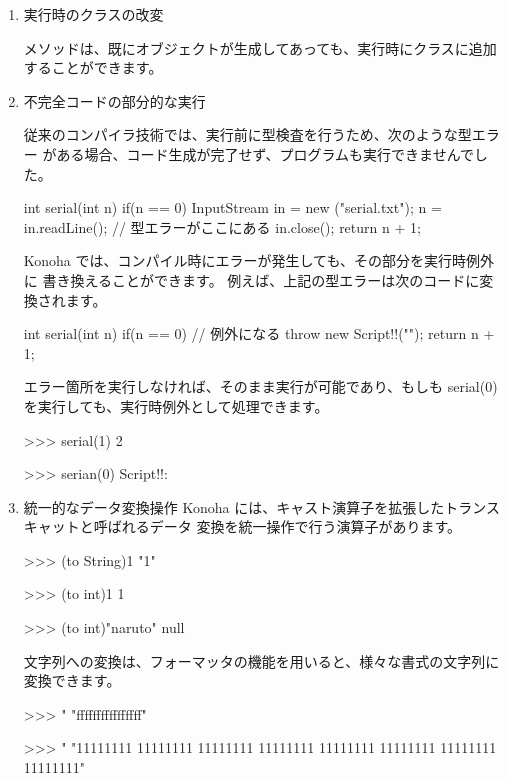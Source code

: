 \documentclass[mingoth,a4paper]{jsarticle}
\begin{document}
\begin{enumerate}
\clearpage

\item 実行時のクラスの改変

メソッドは、既にオブジェクトが生成してあっても、実行時にクラスに追加
することができます。
\\
\item 不完全コードの部分的な実行

従来のコンパイラ技術では、実行前に型検査を行うため、次のような型エラー
がある場合、コード生成が完了せず、プログラムも実行できませんでした。

\begin{commandline}
int serial(int n) {
  if(n == 0) {
    InputStream in = new ("serial.txt");
    n = in.readLine(); // 型エラーがここにある
    in.close();
  }
  return n + 1;
}
\end{commandline}

Konoha では、コンパイル時にエラーが発生しても、その部分を実行時例外に
書き換えることができます。
例えば、上記の型エラーは次のコードに変換されます。

\begin{commandline}
int serial(int n) {
  if(n == 0) { // 例外になる
    throw new Script!!("");
  }
  return n + 1;
}
\end{commandline}

エラー箇所を実行しなければ、そのまま実行が可能であり、もしも
serial(0) を実行しても、実行時例外として処理できます。

\begin{commandline}
>>> serial(1)
2

>>> serian(0)
Script!!:
\end{commandline}

\item 統一的なデータ変換操作
Konoha には、キャスト演算子を拡張したトランスキャットと呼ばれるデータ
変換を統一操作で行う演算子があります。

\begin{commandline}
>>> (to String)1
"1"

>>> (to int)1
1

>>> (to int)"naruto"
null
\end{commandline}

文字列への変換は、フォーマッタの機能を用いると、様々な書式の文字列に
変換できます。

\begin{commandline}
>>> "%
"ffffffffffffffff"

>>> "%
"11111111 11111111 11111111 11111111 11111111 11111111 11111111 11111111"
\end{commandline}


\end{enumerate}
\end{document}
